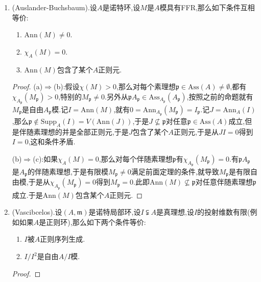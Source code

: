 \begin{enumerate}
\begin{proof}
    	取$A$的极小素理想$\mathfrak{p}$,那么$M_{\mathfrak{p}}$是具有FFR的$A_{\mathfrak{p}}$模,并且$\chi_A(M)=\chi_{A_{\mathfrak{p}}}(M_{\mathfrak{p}})$.于是我们不妨设$(A,\mathfrak{p})$是局部环,并且$\mathfrak{p}=\mathrm{nil}(A)$是幂零根.我们断言上一条的条件是满足的,一旦这成立,这里$M$只能是有限自由模,所以当然有$\chi_A(M)\ge0$.下面证明断言:如果$x_1,\cdots,x_r\in\mathfrak{p}$是有限个元,我们来对$r$归纳证明可以找到$0\not=y\in A$满足$yx_i=0,\forall 1\le i\le r$.对于$r=1$是因为$x_1\in\mathfrak{p}$是幂零元,如果命题对$r-1$成立,那么存在$0\not=z\in A$使得$zx_i=0,\forall 1\le i\le r-1$,因为$x_r$是幂零的,可以找整数$i$使得$zx_r^i\not=0$但$zx_r^{i+1}=0$.取$y=zx_r^i$就满足$y\not=0$并且$yx_i=0,\forall 1\le i\le r$.
    \end{proof}
    \item (Auslander-Buchsbaum).设$A$是诺特环,设$M$是$A$模具有FFR,那么如下条件互相等价:
    \begin{enumerate}
    	\item $\mathrm{Ann}(M)\not=0$.
    	\item $\chi_A(M)=0$.
    	\item $\mathrm{Ann}(M)$包含了某个$A$正则元.
    \end{enumerate}
    \begin{proof}
    	
    	(a)$\Rightarrow$(b):假设$\chi(M)>0$,那么对每个素理想$\mathfrak{p}\in\mathrm{Ass}(A)\not=\emptyset$,都有$\chi_{A_{\mathfrak{p}}}(M_{\mathfrak{p}})>0$,特别的$M_{\mathfrak{p}}\not=0$.另外从$\mathfrak{p}A_{\mathfrak{p}}\in\mathrm{Ass}_{A_{\mathfrak{p}}}(A_{\mathfrak{p}})$,按照之前的命题就有$M_{\mathfrak{p}}$是自由$A_{\mathfrak{p}}$模.记$I=\mathrm{Ann}(M)$,就有$0=\mathrm{Ann}_{A_{\mathfrak{p}}}(M_{\mathfrak{p}})=I_{\mathfrak{p}}$.记$J=\mathrm{Ann}_A(I)$,那么$\mathfrak{p}\not\in\mathrm{Supp}_A(I)=V(\mathrm{Ann}(J))$,于是$J\not\subseteq\mathfrak{p}$对任意$\mathfrak{p}\in\mathrm{Ass}(A)$成立,但是伴随素理想的并是全部正则元,于是$J$包含了某个$A$正则元,于是从$JI=0$得到$I=0$,这和条件矛盾.
    	
    	\qquad
    	
    	(b)$\Rightarrow$(c):如果$\chi_A(M)=0$,那么对每个伴随素理想$\mathfrak{p}$有$\chi_{A_{\mathfrak{p}}}(M_{\mathfrak{p}})=0$.有$\mathfrak{p}A_{\mathfrak{p}}$是$A_{\mathfrak{p}}$的伴随素理想,于是有限模$M_{\mathfrak{p}}\not=0$满足前面定理的条件,就导致$M_{\mathfrak{p}}$是有限自由模,于是从$\chi_{A_{\mathfrak{p}}}(M_{\mathfrak{p}})=0$得到$M_{\mathfrak{p}}=0$.此即$\mathrm{Ann}(M)\not\subseteq\mathfrak{p}$对任意伴随素理想$\mathfrak{p}$成立.于是$\mathrm{Ann}(M)$包含某个$A$正则元.
    \end{proof}
    \item (Vascibcelos).设$(A,\mathfrak{m})$是诺特局部环,设$I\subsetneqq A$是真理想,设$I$的投射维数有限(例如如果$A$是正则环),那么如下两个条件等价:
    \begin{enumerate}
    	\item $I$被$A$正则序列生成.
    	\item $I/I^2$是自由$A/I$模.
    \end{enumerate}
    \begin{proof}
    	

\end{proof}
\end{enumerate}
